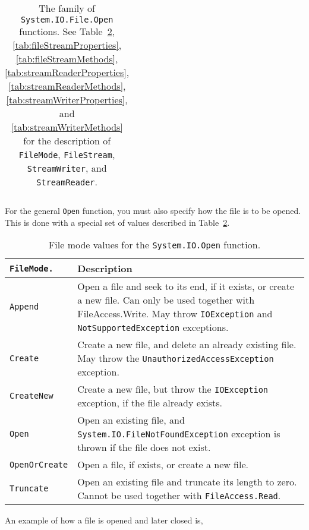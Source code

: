 \begin{table}
\begin{center}
\begin{tabularx}{\linewidth}{|>{\hsize=.45\hsize\raggedright\arraybackslash}X|>{\hsize=.55\hsize\raggedright\arraybackslash}X|}
      \hline
    \end{tabularx}
  \end{center}
  \caption{The family of \lstinline!System.IO.File.Open! functions. See Table~\ref{tab:filemode}, \ref{tab:fileStreamProperties}, \ref{tab:fileStreamMethods}, \ref{tab:streamReaderProperties}, \ref{tab:streamReaderMethods}, \ref{tab:streamWriterProperties}, and \ref{tab:streamWriterMethods} for the description of \lstinline{FileMode}, \lstinline{FileStream}, \lstinline{StreamWriter}, and \lstinline{StreamReader}.}
  \label{tab:File.Open}
\end{table}
For the general \lstinline!Open! function, you must also specify how the file is to be opened. This is done with a special set of values described in Table~\ref{tab:filemode}. 
\begin{table}
  \centering
  \begin{tabularx}{\linewidth}{|l|X|}
    \hline
    \lstinline{FileMode.} & Description\\
    \hline
    \lstinline{Append} & Open a file and seek to its end, if it exists, or create a new file. Can only be used together with FileAccess.Write. May throw \mbox{\lstinline{IOException}} and \mbox{\lstinline{NotSupportedException}} exceptions.\\
    \hline
    \lstinline{Create} & Create a new file, and delete an already existing file. May throw the \mbox{\lstinline{UnauthorizedAccessException}} exception.\\
    \hline
    \lstinline{CreateNew} & Create a new file, but throw the \mbox{\lstinline{IOException}} exception, if the file already exists.\\
    \hline
    \lstinline{Open} & Open an existing file, and \mbox{\lstinline{System.IO.FileNotFoundException}} exception is thrown if the file does not exist.\\
    \hline
    \lstinline{OpenOrCreate} & Open a file, if exists, or create a new file.\\
    \hline
    \lstinline{Truncate} & Open an existing file and truncate its length to zero. Cannot be used together with \mbox{\lstinline{FileAccess.Read}}.\\
    \hline
  \end{tabularx}
  \caption{File mode values for the \lstinline!System.IO.Open! function.}
  \label{tab:filemode}
\end{table}
An example of how a file is opened and later closed is,
%
